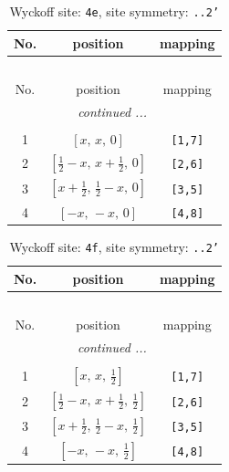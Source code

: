 \documentclass[fleqn,8pt]{jsarticle}
\begin{document}
\begin{longtable}{ccc}
\caption{Wyckoff site: {\tt 4e}, site symmetry: {\tt ..2'}}
 \\
 \hline \hline
No. & position & mapping \\ \hline \endfirsthead

\multicolumn{2}{l}{\tablename\ \thetable{}} \\
 \hline \hline
No. & position & mapping \\ \hline \endhead

 \hline \hline
\multicolumn{2}{r}{\footnotesize\it continued ...} \\ \endfoot

 \hline \hline
\multicolumn{2}{r}{} \\ \endlastfoot

1 & $\left[ x,\, x,\, 0 \right]$ & {\tt [1,7]} \\ \hline
2 & $\left[ \frac{1}{2} - x,\, x + \frac{1}{2},\, 0 \right]$ & {\tt [2,6]} \\ \hline
3 & $\left[ x + \frac{1}{2},\, \frac{1}{2} - x,\, 0 \right]$ & {\tt [3,5]} \\ \hline
4 & $\left[ - x,\, - x,\, 0 \right]$ & {\tt [4,8]} \\
\end{longtable}
\renewcommand{\arraystretch}{1.2}
\begin{longtable}{ccc}
\caption{Wyckoff site: {\tt 4f}, site symmetry: {\tt ..2'}}
 \\
 \hline \hline
No. & position & mapping \\ \hline \endfirsthead

\multicolumn{2}{l}{\tablename\ \thetable{}} \\
 \hline \hline
No. & position & mapping \\ \hline \endhead

 \hline \hline
\multicolumn{2}{r}{\footnotesize\it continued ...} \\ \endfoot

 \hline \hline
\multicolumn{2}{r}{} \\ \endlastfoot

1 & $\left[ x,\, x,\, \frac{1}{2} \right]$ & {\tt [1,7]} \\ \hline
2 & $\left[ \frac{1}{2} - x,\, x + \frac{1}{2},\, \frac{1}{2} \right]$ & {\tt [2,6]} \\ \hline
3 & $\left[ x + \frac{1}{2},\, \frac{1}{2} - x,\, \frac{1}{2} \right]$ & {\tt [3,5]} \\ \hline
4 & $\left[ - x,\, - x,\, \frac{1}{2} \right]$ & {\tt [4,8]} \\
\end{longtable}
\end{document}
